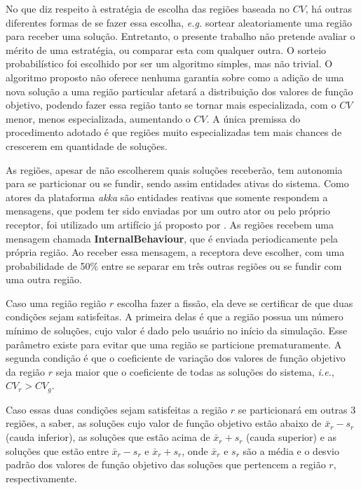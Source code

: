 No que diz respeito à estratégia de escolha das regiões baseada no $CV$, há outras diferentes formas de se fazer essa escolha, \textit{e.g.} sortear aleatoriamente uma região para receber uma solução. Entretanto, o presente trabalho não pretende avaliar o mérito de uma estratégia, ou comparar esta com qualquer outra. O sorteio probabilístico foi escolhido por ser um algoritmo simples, mas não trivial. O algoritmo proposto não oferece nenhuma garantia sobre como a adição de uma nova solução a uma região particular afetará a distribuição dos valores de função objetivo, podendo fazer essa região tanto se tornar mais especializada, com o $CV$ menor, menos especializada, aumentando  o $CV$. A única premissa do procedimento adotado é que regiões muito especializadas tem mais chances de crescerem em quantidade de soluções. 

As regiões, apesar de não escolherem quais soluções receberão, tem autonomia para se particionar ou se fundir, sendo assim entidades ativas do sistema. Como atores da plataforma \textit{akka} são entidades reativas que somente respondem a mensagens, que podem ter sido enviadas por um outro ator ou pelo próprio receptor, foi utilizado um artifício já proposto por . As regiões recebem uma mensagem chamada \textbf{InternalBehaviour}, que é enviada periodicamente pela própria região. Ao receber essa mensagem, a receptora deve escolher, com uma probabilidade de 50\% entre se separar em três outras regiões ou se fundir com uma outra região.


Caso uma região região $r$ escolha fazer a fissão, ela deve se certificar de que  duas condições sejam satisfeitas. A primeira delas é que a região possua um número mínimo de soluções, cujo valor é dado pelo usuário no início da simulação. Esse parâmetro existe para evitar que uma região se particione prematuramente. A segunda condição é que o coeficiente de variação dos valores de função objetivo da região $r$ seja maior que o coeficiente de todas as soluções do sistema, \textit{i.e.},  $CV_r > CV_g$. 

Caso essas duas condições sejam satisfeitas a região $r$ se particionará em outras 3 regiões, a saber, as soluções cujo valor de função objetivo estão abaixo de $\bar{x}_{r} - s_{r}$ (cauda inferior), as soluções que estão acima de $\bar{x}_{r} + s_{r}$ (cauda superior) e as soluções que estão entre $\bar{x}_{r} - s_{r}$ e  $\bar{x}_{r} + s_{r}$, onde $\bar{x}_r$ e $s_r$ são a média e o desvio padrão dos valores de função objetivo das soluções que pertencem a região $r$, respectivamente. 

